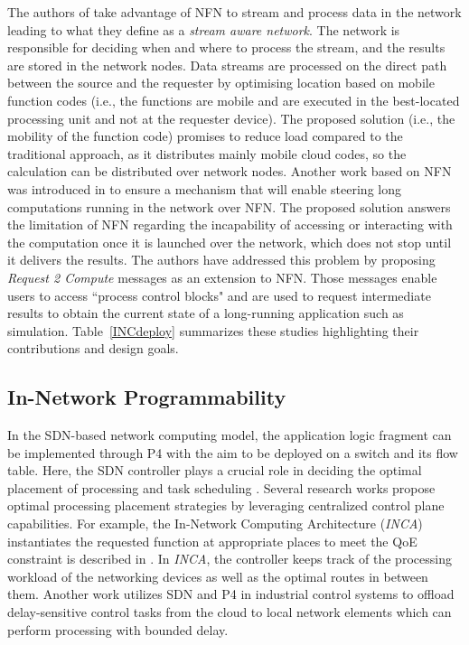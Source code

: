 The authors of \cite{8264868} take advantage of NFN to stream and process data in the network leading to what they define as a  \textit{stream aware network}. The network is responsible for deciding when and where to process the stream, and the results are stored in the network nodes. Data streams are processed on the direct path between the source and the requester by optimising location based on mobile function codes (i.e., the functions are mobile and are executed in the best-located processing unit and not at the requester device). The proposed solution (i.e., the mobility of the function code) promises to reduce load compared to the traditional approach, as it distributes mainly mobile cloud codes, so the calculation can be distributed over network nodes.
Another work based on NFN was introduced in  \cite{scherb2017execution} to ensure a mechanism that will enable steering long computations running in the network over NFN. The proposed solution answers the limitation of NFN regarding the incapability of accessing or interacting with the computation once it is launched over the network, which does not stop until it delivers the results. The authors have addressed this problem by proposing \textit{Request 2 Compute} messages as an extension to NFN. Those messages enable users to access 
``process control blocks" and are used to request intermediate results to obtain the current state of a long-running application such as simulation. Table~\ref{INCdeploy} summarizes these studies  highlighting their contributions and design goals.


\subsection{In-Network Programmability}\label{Prog} 

\noindent In the SDN-based network computing model, the application logic fragment can be implemented through P4 with the aim to be deployed on a switch and its flow table. Here, the SDN controller plays a crucial role in deciding the optimal placement of processing and task scheduling \cite{tokusashi2019case}. Several research works propose optimal processing placement strategies by leveraging centralized control plane capabilities. For example, the In-Network Computing Architecture (\textit{INCA}) instantiates the requested function at appropriate places to meet the QoE constraint is described in \cite{10.11453359993.3366649}. In \textit{INCA}, the controller keeps track of the processing workload of the networking devices as well as the optimal routes in between them. Another work \cite{ruth2018towards} utilizes SDN and P4 in industrial control systems to offload delay-sensitive control tasks from the cloud to local network elements which can perform processing with bounded delay.  


